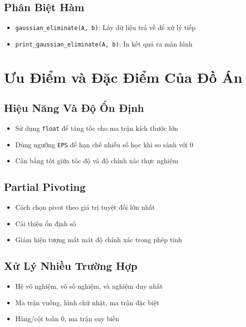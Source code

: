 \documentclass[12pt, a4paper, twoside]{article}
\begin{document}
\subsection{Phân Biệt Hàm}

\begin{itemize}
    \item \texttt{gaussian\_eliminate(A, b)}: Lấy dữ liệu trả về để xử lý tiếp
    \item \texttt{print\_gaussian\_eliminate(A, b)}: In kết quả ra màn hình
\end{itemize}

\section{Ưu Điểm và Đặc Điểm Của Đồ Án}

\subsection{Hiệu Năng Và Độ Ổn Định}

\begin{itemize}
    \item Sử dụng \texttt{float} để tăng tốc cho ma trận kích thước lớn
    \item Dùng ngưỡng \texttt{EPS} để hạn chế nhiễu số học khi so sánh với 0
    \item Cân bằng tốt giữa tốc độ và độ chính xác thực nghiệm
\end{itemize}

\subsection{Partial Pivoting}

\begin{itemize}
    \item Cách chọn pivot theo giá trị tuyệt đối lớn nhất
    \item Cải thiện ổn định số 
    \item Giảm hiện tượng mất mát độ chính xác trong phép tính
\end{itemize}

\subsection{Xử Lý Nhiều Trường Hợp}

\begin{itemize}
    \item Hệ vô nghiệm, vô số nghiệm, và nghiệm duy nhất
    \item Ma trận vuông, hình chữ nhật, ma trận đặc biệt
    \item Hàng/cột toàn 0, ma trận suy biến
\end{itemize}
\end{document}
